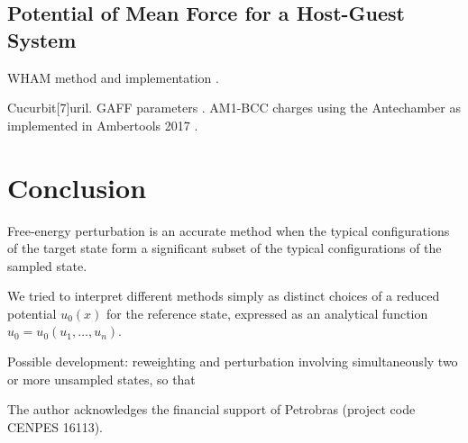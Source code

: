 \documentclass[journal=jctcce,manuscript=article,layout=twocolumn]{achemso}
\begin{document}
\subsection{Potential of Mean Force for a Host-Guest System}

WHAM method\cite{Kumar_1992} and implementation \cite{Grossfield_nodate}.

Cucurbit[7]uril. GAFF parameters \cite{Wang_2004}. AM1-BCC charges \cite{Jakalian_2000, Jakalian_2002} using the Antechamber \cite{Wang_2006} as implemented in Ambertools 2017 \cite{Case_2017}.

\section{Conclusion}

Free-energy perturbation is an accurate method when the typical configurations of the target state form a significant subset of the typical configurations of the sampled state.

We tried to interpret different methods simply as distinct choices of a reduced potential $u_0(x)$ for the reference state, expressed as an analytical function $u_0 = u_0(u_1,\dots,u_n)$.

Possible development: reweighting and perturbation involving simultaneously two or more unsampled states, so that  

\begin{acknowledgement}

The author acknowledges the financial support of Petrobras (project code CENPES 16113).

\end{acknowledgement}


\end{document}
